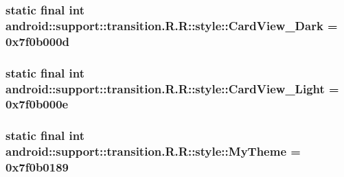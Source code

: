 \hypertarget{classandroid_1_1support_1_1transition_1_1_r_1_1style_af9bbfbe249c3baea0fc045b19d56a0f}{
\subsubsection[{CardView\_\-Dark}]{\setlength{\rightskip}{0pt plus 5cm}static final int android::support::transition.R.R::style::CardView\_\-Dark = 0x7f0b000d}}
\label{classandroid_1_1support_1_1transition_1_1_r_1_1style_af9bbfbe249c3baea0fc045b19d56a0f}


\hypertarget{classandroid_1_1support_1_1transition_1_1_r_1_1style_1f2576771fb26adec7fbf3404b36a57b}{
\subsubsection[{CardView\_\-Light}]{\setlength{\rightskip}{0pt plus 5cm}static final int android::support::transition.R.R::style::CardView\_\-Light = 0x7f0b000e}}
\label{classandroid_1_1support_1_1transition_1_1_r_1_1style_1f2576771fb26adec7fbf3404b36a57b}


\hypertarget{classandroid_1_1support_1_1transition_1_1_r_1_1style_de16003a178df26392f27695c669262c}{
\subsubsection[{MyTheme}]{\setlength{\rightskip}{0pt plus 5cm}static final int android::support::transition.R.R::style::MyTheme = 0x7f0b0189}}
\label{classandroid_1_1support_1_1transition_1_1_r_1_1style_de16003a178df26392f27695c669262c}


